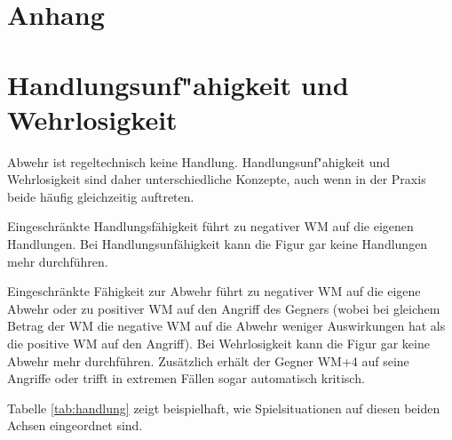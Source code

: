 \documentclass[10pt,a4paper,germanpar]{article}
\begin{document}
\appendix

\section*{Anhang}

\section{Handlungsunf"ahigkeit und Wehrlosigkeit}
\label{behindert}

Abwehr ist regeltechnisch keine Handlung. Handlungsunf"ahigkeit und
Wehrlosigkeit sind daher unterschiedliche Konzepte, auch wenn in der
Praxis beide häufig gleichzeitig auftreten.

Eingeschränkte Handlungsfähigkeit führt zu negativer WM auf die
eigenen Handlungen. Bei Handlungsunfähigkeit kann die Figur gar keine
Handlungen mehr durchführen.

Eingeschränkte Fähigkeit zur Abwehr führt zu negativer WM auf die
eigene Abwehr oder zu positiver WM auf den Angriff des Gegners (wobei
bei gleichem Betrag der WM die negative WM auf die Abwehr weniger
Auswirkungen hat als die positive WM auf den Angriff). Bei
Wehrlosigkeit kann die Figur gar keine Abwehr mehr
durchführen. Zusätzlich erhält der Gegner WM+4 auf seine Angriffe oder
trifft in extremen Fällen sogar automatisch kritisch.

Tabelle \ref{tab:handlung} zeigt beispielhaft, wie Spielsituationen
auf diesen beiden Achsen eingeordnet sind.

\pagebreak
\end{document}
